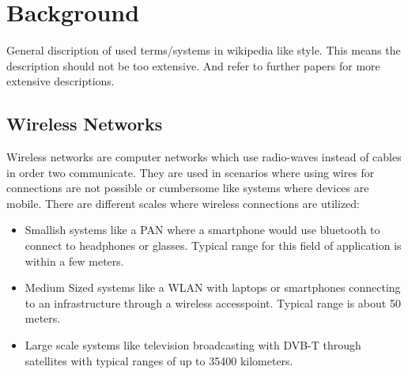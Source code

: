 \chapter{Background}
General discription of used terms/systems in wikipedia like style. This means the description should not be too extensive.
And refer to further papers for more extensive descriptions.
\section{Wireless Networks}
  Wireless networks are computer networks which use radio-waves instead of cables in order two communicate.
  They are used in scenarios where using wires for connections are not possible or cumbersome like systems where devices are mobile.
  There are different scales where wireless connections are utilized:
    \begin{itemize}
      \item Smallish systems like a \ac{PAN} where a smartphone would use bluetooth to connect to headphones or glasses. Typical range for this field of
	application is within a few meters.
      \item Medium Sized systems like a \ac{WLAN} with laptops or smartphones connecting to an infrastructure through a wireless accesspoint.
	Typical range is about 50 meters.
      \item Large scale systems like television broadcasting with \ac{DVB-T} through satellites with typical ranges of up to 35400 kilometers.
    \end{itemize}

